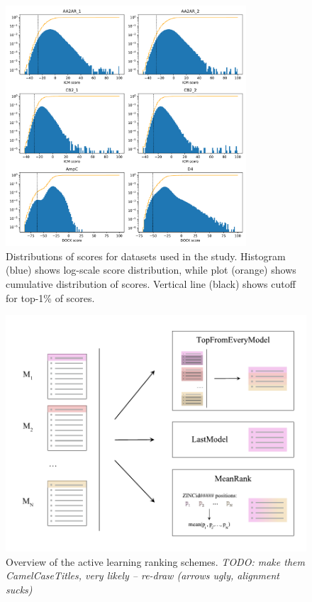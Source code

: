 \begin{figure}[h]
\centering
\includegraphics[width=0.8\textwidth]{figures/figure_1_scores_distribution_v3.pdf}
\caption{Distributions of scores for datasets used in the study. Histogram (blue) shows log-scale score distribution, while plot (orange) shows cumulative distribution of scores. Vertical line (black) shows cutoff for top-1\% of scores.}
\label{fig:fig_1}
\end{figure}


\begin{figure}[h]
\centering
\includegraphics[width=\textwidth]{figures/Figure_2_v4.pdf}
\caption{Overview of the active learning ranking schemes. \textit{TODO: make them CamelCaseTitles, very likely -- re-draw (arrows ugly, alignment sucks)}}
\label{fig:fig_2_scheme}
\end{figure}


